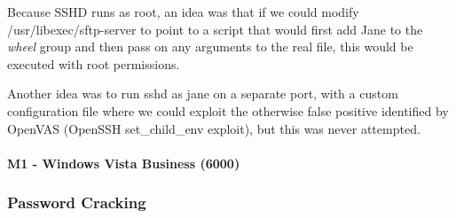 Because SSHD runs as root, an idea was that if we could modify /usr/libexec/sftp-server to point to a script that would first add Jane to the \textit{wheel} group and then pass on any arguments to the real file, this would be executed with root permissions. 

Another idea was to run sshd as jane on a separate port, with a custom configuration file where we could exploit the otherwise false positive identified by OpenVAS (OpenSSH set\_child\_env exploit), but this was never attempted. 
 

\paragraph{M1 - Windows Vista Business (6000)}




\subsubsection{Password Cracking}
